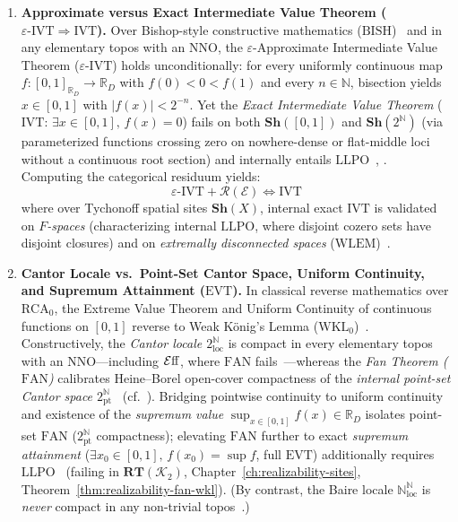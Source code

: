 \begin{enumerate}
  \item \textbf{Approximate versus Exact Intermediate Value Theorem ($\varepsilon\text{-}\mathrm{IVT} \Rightarrow \mathrm{IVT}$).} Over Bishop-style constructive mathematics ($\mathrm{BISH}$)~\cite{Bishop67,Ishihara06} and in any elementary topos with an $\mathrm{NNO}$, the $\varepsilon$-Approximate Intermediate Value Theorem ($\varepsilon\text{-}\mathrm{IVT}$) holds unconditionally: for every uniformly continuous map $f: [0,1]_{\mathbb{R}_D} \to \mathbb{R}_D$ with $f(0) < 0 < f(1)$ and every $n \in \mathbb{N}$, bisection yields $x \in [0,1]$ with $|f(x)| < 2^{-n}$. Yet the \emph{Exact Intermediate Value Theorem} ($\mathrm{IVT}$: $\exists x \in [0,1],\, f(x) = 0$) fails on both $\mathbf{Sh}([0, 1])$ and $\mathbf{Sh}(2^{\mathbb{N}})$ (via parameterized functions crossing zero on nowhere-dense or flat-middle loci without a continuous root section) and internally entails $\mathrm{LLPO}$~\cite[Ch.~3]{BridgesRichman87}, \cite[\S D4.7]{Johnstone02}. Computing the categorical residuum yields:
\[
  \varepsilon\text{-}\mathrm{IVT} + \mathcal{R}(\mathcal{E}) \iff \mathrm{IVT}
\]
where over Tychonoff spatial sites $\mathbf{Sh}(X)$, internal exact $\mathrm{IVT}$ is validated on \emph{$F$-spaces} (characterizing internal $\mathrm{LLPO}$, where disjoint cozero sets have disjoint closures) and on \emph{extremally disconnected spaces} ($\mathrm{WLEM}$)~\cite[\S D4.7]{Johnstone02}.

  \item \textbf{Cantor Locale vs.\ Point-Set Cantor Space, Uniform Continuity, and Supremum Attainment ($\mathrm{EVT}$).} In classical reverse mathematics over $\mathrm{RCA}_0$, the Extreme Value Theorem and Uniform Continuity of continuous functions on $[0,1]$ reverse to Weak K\"onig's Lemma ($\mathrm{WKL}_0$)~\cite[Ch.~IV]{Simpson09}. Constructively, the \emph{Cantor locale $2^{\mathbb{N}}_{\mathrm{loc}}$} is compact in every elementary topos with an $\mathrm{NNO}$---including $\mathcal{E}\mathrm{ff}$, where $\mathrm{FAN}$ fails~\cite[\S C1.2, \S D4.7]{Johnstone02}---whereas the \emph{Fan Theorem ($\mathrm{FAN}$)} calibrates Heine--Borel open-cover compactness of the \emph{internal point-set Cantor space $2^{\mathbb{N}}_{\mathrm{pt}}$}~\cite[Chs.~III--IV]{Johnstone82} (cf.~\cite{Bishop67,Ishihara06}). Bridging pointwise continuity to uniform continuity and existence of the \emph{supremum value} $\sup_{x \in [0,1]} f(x) \in \mathbb{R}_D$ isolates point-set $\mathrm{FAN}$ ($2^{\mathbb{N}}_{\mathrm{pt}}$ compactness); elevating $\mathrm{FAN}$ further to exact \emph{supremum attainment} ($\exists x_0 \in [0,1],\, f(x_0) = \sup f$, full $\mathrm{EVT}$) additionally requires $\mathrm{LLPO}$~\cite[Ch.~2]{BridgesRichman87} (failing in $\mathbf{RT}(\mathcal{K}_2)$, Chapter~\ref{ch:realizability-sites}, Theorem~\ref{thm:realizability-fan-wkl}). (By contrast, the Baire locale $\mathbb{N}^{\mathbb{N}}_{\mathrm{loc}}$ is \emph{never} compact in any non-trivial topos~\cite[Chs.~III--IV]{Johnstone82}.)

\end{enumerate}

